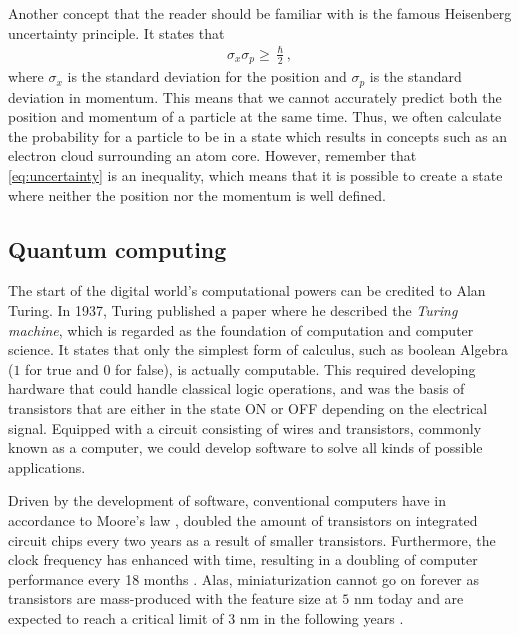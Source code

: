 
Another concept that the reader should be familiar with is the famous Heisenberg uncertainty principle. It states that
\begin{align}
    \sigma_x \sigma_p \geq \frac{\hslash}{2},
    \label{eq:uncertainty}
\end{align}
where $\sigma_x$ is the standard deviation for the position and $\sigma_p$ is the standard deviation in momentum. This means that we cannot accurately predict both the position and momentum of a particle at the same time. Thus, we often calculate the probability for a particle to be in a state which results in concepts such as an electron cloud surrounding an atom core. However, remember that \autoref{eq:uncertainty} is an inequality, which means that it is possible to create a state where neither the position nor the momentum is well defined.

\subsection{Quantum computing}
The start of the digital world's computational powers can be credited to Alan Turing. In 1937, Turing \cite{Turing1937} published a paper where he described the \textit{Turing machine}, which is regarded as the foundation of computation and computer science. It states that only the simplest form of calculus, such as boolean Algebra ($1$ for true and $0$ for false), is actually computable. This required developing hardware that could handle classical logic operations, and was the basis of transistors that are either in the state ON or OFF depending on the electrical signal. Equipped with a circuit consisting of wires and transistors, commonly known as a computer, we could develop software to solve all kinds of possible applications.

Driven by the development of software, conventional computers have in accordance to Moore's law \cite{Moore1965}, doubled the amount of transistors on integrated circuit chips every two years as a result of smaller transistors. Furthermore, the clock frequency has enhanced with time, resulting in a doubling of computer performance every 18 months \cite{Pavicic2006}. Alas, miniaturization cannot go on forever as transistors are mass-produced with the feature size at $5$ nm today and are expected to reach a critical limit of $3$ nm in the following years \cite{Gwennap2020}.

